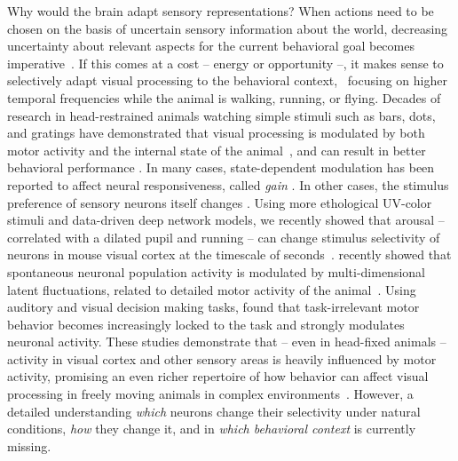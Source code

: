 \documentclass[COG,11pt]{ercgrant}
\begin{document}
Why would the brain adapt sensory representations? When actions need to be chosen on the basis of uncertain sensory information about the world, decreasing uncertainty about relevant aspects for the current behavioral goal becomes imperative~\parencite{Chebolu2022-tb}. 
If this comes at a cost -- energy or opportunity --, it makes sense to selectively adapt visual processing to the behavioral context, \eg~focusing on  higher temporal frequencies while the animal is walking, running, or flying.
Decades of research in head-restrained animals watching simple stimuli such as bars, dots, and gratings have demonstrated that visual processing is modulated by both motor activity and the internal state of the animal~\parencite{Rowell1971-zj, Wiersma1968-xt, Motter1993-od, Maimon2010-sa, Niell2010-bs,Bezdudnaya2006-ge, Treue1996-lp, Musall2019-kd, Busse2017-rt}, and can result in better behavioral performance \parencite{Spitzer1988-kq, Bennett2013-rk, Dadarlat2017-jw, De_Gee2022-ir}.
In many cases, state-dependent modulation has been reported to  affect neural responsiveness, called \textit{gain} \parencite{Eggermann2014-xp, Niell2010-bs, McAdams1999-cs,Schroder2020-jl, Dadarlat2017-jw, Mineault2016-fk}. 
In other cases, the stimulus preference of sensory neurons itself changes \parencite{Chiappe2010-bm, Bezdudnaya2006-ge, Andermann2011-vw, Treue1996-lp}. 
Using more ethological UV-color stimuli and data-driven deep network models, we recently showed that arousal -- correlated with a dilated pupil and running -- can change stimulus selectivity of neurons in mouse visual cortex at the timescale of seconds~\parencite{Franke2022-do}. 
\textcite{Stringer2019-lt} recently showed that spontaneous neuronal population activity is modulated by multi-dimensional latent fluctuations, related to detailed motor activity of the animal~\parencite{Syeda2022-bk}.
Using auditory and visual decision making tasks, \textcite{Musall2019-kd} found that task-irrelevant motor behavior becomes increasingly locked to the task and strongly modulates neuronal activity.
These studies demonstrate that -- even in head-fixed animals -- activity in visual cortex and other sensory areas is heavily influenced by motor activity, promising an even richer repertoire of how behavior can affect visual processing in freely moving animals in complex environments~\parencite{Busse2017-rt,Huk2018-ez, Datta2019-qj}.
However, a detailed understanding \textit{which} neurons change their selectivity under natural conditions, \textit{how} they change it, and in \textit{which behavioral context} is currently missing.
\end{document}

